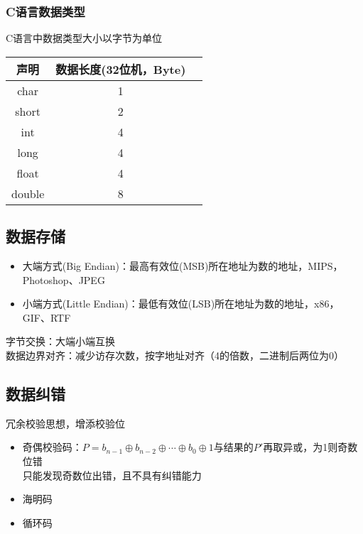 \subsubsection{C语言数据类型}
C语言中数据类型大小以字节为单位
\begin{center}
\begin{tabular}{|c|c|c|}\hline
声明 & 数据长度(32位机，Byte)\\\hline
char & 1 \\\hline
short & 2 \\\hline
int & 4 \\\hline
long & 4 \\\hline
float & 4 \\\hline
double & 8 \\\hline
\end{tabular}
\end{center}


\subsection{数据存储}
\begin{itemize}
	\item 大端方式(Big Endian)：最高有效位(MSB)所在地址为数的地址，MIPS，Photoshop、JPEG
	\item 小端方式(Little Endian)：最低有效位(LSB)所在地址为数的地址，x86，GIF、RTF
\end{itemize}
字节交换：大端小端互换\\
数据边界对齐：减少访存次数，按字地址对齐（4的倍数，二进制后两位为0）


\subsection{数据纠错}
冗余校验思想，增添校验位
\begin{itemize}
	\item 奇偶校验码：$P=b_{n-1}\oplus b_{n-2}\oplus\cdots\oplus b_0\oplus 1$与结果的$P'$再取异或，为1则奇数位错\\
	只能发现奇数位出错，且不具有纠错能力
	\item 海明码
	\item 循环码
\end{itemize}


